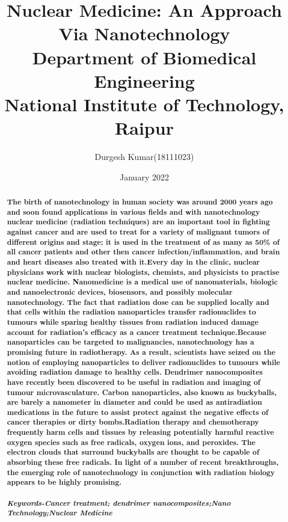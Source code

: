 \documentclass{article}
\title{%
Nuclear Medicine: An Approach Via Nanotechnology\\
   \large Department of Biomedical Engineering\\
    National Institute of Technology, Raipur}
\author{Durgesh Kumar(18111023)}
\date{January 2022}
\begin{document}
\maketitle

\begin{abstract}\textbf{The birth of nanotechnology in human society was around 2000 years ago and soon found applications in various fields and with nanotechnology nuclear medicine (radiation techniques) are an important tool in fighting against cancer and are used to treat for a variety of malignant tumors of different origins and stage; it is used in the treatment of as many as 50\% of all cancer patients and other then cancer infection/inflammation, and brain and heart diseases also treated with it.Every day in the clinic, nuclear physicians work with nuclear biologists, chemists, and physicists to practise nuclear medicine. Nanomedicine is a medical use of nanomaterials, biologic and nanoelectronic devices, biosensors, and possibly molecular nanotechnology. The fact that radiation dose can be supplied locally and that cells within the radiation nanoparticles transfer radionuclides to tumours while sparing healthy tissues from radiation induced damage account for radiation's efficacy as a cancer treatment technique.Because nanoparticles can be targeted to malignancies, nanotechnology has a promising future in radiotherapy. As a result, scientists have seized on the notion of employing nanoparticles to deliver radionuclides to tumours while avoiding radiation damage to healthy cells. Dendrimer nanocomposites have recently been discovered to be useful in radiation and imaging of tumour microvasculature. Carbon nanoparticles, also known as buckyballs, are barely a nanometer in diameter and could be used as antiradiation medications in the future to assist protect against the negative effects of cancer therapies or dirty bombs.Radiation therapy and chemotherapy frequently harm cells and tissues by releasing potentially harmful reactive oxygen species such as free radicals, oxygen ions, and peroxides. The electron clouds that surround buckyballs are thought to be capable of absorbing these free radicals. In light of a number of recent breakthroughs, the emerging role of nanotechnology in conjunction with radiation biology appears to be highly promising.}\\ 
    \\
    \textbf{\textit{Keywords-Cancer treatment; dendrimer nanocomposites;Nano Technology;Nuclear Medicine }}
\end{abstract}
\end{document}

